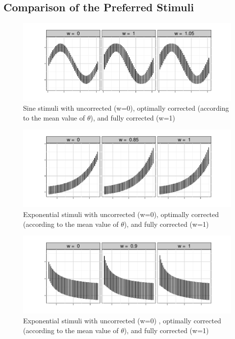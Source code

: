 \documentclass[journal]{vgtc}\usepackage{graphicx, color}
\begin{document}
\subsection{Comparison of the Preferred Stimuli}
\begin{figure}\centering
\includegraphics[width=\linewidth]{figure/fig-sineOptimalWeights}
\caption{Sine stimuli with uncorrected (w=0), optimally corrected (according to the mean value of $\theta$), and fully corrected (w=1)}\label{fig:sineCorrectionOptimal}
\end{figure}
\begin{figure}\centering
\includegraphics[width=\linewidth]{figure/fig-expOptimalWeights}
\caption{Exponential stimuli with uncorrected (w=0), optimally corrected (according to the mean value of $\theta$), and fully corrected (w=1)}\label{fig:expCorrectionOptimal}
\end{figure}
\begin{figure}\centering
\includegraphics[width=\linewidth]{figure/fig-invOptimalWeights}
\caption{Exponential stimuli with uncorrected (w=0) , optimally corrected (according to the mean value of $\theta$), and fully corrected (w=1)}\label{fig:invCorrectionOptimal}
\end{figure}
\end{document}
